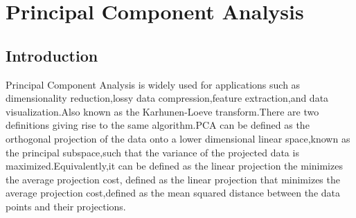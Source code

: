  \chapter{Principal Component Analysis}
 \section{Introduction}
 Principal Component Analysis is widely used for applications such as dimensionality reduction,lossy data compression,feature extraction,and data visualization.Also known as the Karhunen-Loeve transform.There are two definitions giving rise to the same algorithm.PCA can be defined as the orthogonal projection of the data onto a lower dimensional linear space,known as the principal subspace,such that the variance of the projected data  is maximized.Equivalently,it can be defined as the linear projection the minimizes the average projection cost,
defined as  the linear projection that minimizes the average projection cost,defined as the mean squared distance between the data points and their projections.
